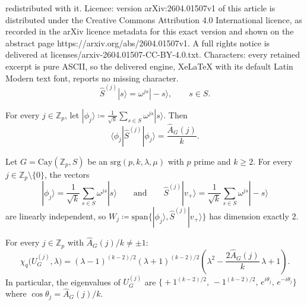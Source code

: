 \documentclass[10pt,a4paper]{amsart}
\newcommand{\Ahat}{\widehat{A}_G}
\newcommand{\Cay}{\mathrm{Cay}}
\newcommand{\Shat}{\hat{S}^{(j)}}
\newcommand{\Uj}{U_G^{(j)}}
\newcommand{\Z}{\mathbb{Z}}
\newcommand{\bra}[1]{\langle #1|}
\newcommand{\eqdef}{\coloneqq}
\newcommand{\ket}[1]{|#1\rangle}
\newcommand{\phij}{\phi_j}
\newcommand{\srg}{\mathrm{srg}}
\newcommand{\vplus}{v_+}
\begin{document}
redistributed with it. Licence: version arXiv:2604.01507v1 of this article is distributed under the Creative Commons Attribution 4.0 International licence, as recorded in the arXiv licence metadata for this exact version and shown on the abstract page https://arxiv.org/abs/2604.01507v1. A full rights notice is delivered at licenses/arxiv-2604.01507-CC-BY-4.0.txt. Characters: every retained excerpt is pure ASCII, so the delivered engine, XeLaTeX with its default Latin Modern text font, reports no missing character.
  \begin{equation}\label{eq:Shat}
    \Shat\ket{s} = \omega^{js}\ket{-s}, \qquad s \in S.
  \end{equation}

\begin{proposition}\label{prop:key}
  For every $j \in \Z_p$, let
  $\ket{\phij} \eqdef \frac{1}{\sqrt{k}}\sum_{s \in S}\omega^{js}\ket{s}$.
  Then
  \[
    \bra{\phij}\Shat\ket{\phij} = \frac{\Ahat(j)}{k}.
  \]
\end{proposition}

\begin{lemma}\label{lem:lindep}
  Let $G = \Cay(\Z_p, S)$ be an $\srg(p,k,\lambda,\mu)$ with $p$ prime
  and $k \geq 2$.  For every $j \in \Z_p \setminus \{0\}$, the vectors
  \[
    \ket{\phij} = \frac{1}{\sqrt{k}}\sum_{s \in S}\omega^{js}\ket{s}
    \qquad\text{and}\qquad
    \Shat\ket{\vplus} = \frac{1}{\sqrt{k}}\sum_{s \in S}\omega^{js}\ket{-s}
  \]
  are linearly independent, so
  $W_j \eqdef \mathrm{span}\{\ket{\phij},\Shat\ket{\vplus}\}$
  has dimension exactly $2$.
\end{lemma}

\begin{lemma}\label{lem:formula}
  For every $j \in \Z_p$ with $\Ahat(j)/k \neq \pm 1$:
  \begin{equation}\label{eq:chi-block}
    \chi_q\!\bigl(\Uj, \lambda\bigr)
    = (\lambda - 1)^{(k-2)/2}(\lambda + 1)^{(k-2)/2}
      \!\left(\lambda^2 - \frac{2\Ahat(j)}{k}\,\lambda + 1\right).
  \end{equation}
  In particular, the eigenvalues of $\Uj$ are
  $\bigl\{+1^{(k-2)/2},\,-1^{(k-2)/2},\,e^{i\theta_j},\,e^{-i\theta_j}\bigr\}$
  where $\cos\theta_j = \Ahat(j)/k$.
\end{lemma}
\end{document}
